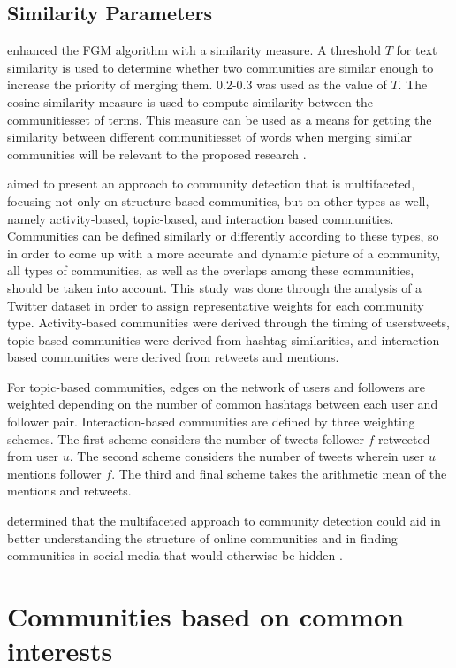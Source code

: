 \subsection{Similarity Parameters}


 enhanced the FGM algorithm with a similarity measure. A threshold $T$ for text similarity is used to determine whether two communities are similar enough to increase the priority of merging them. 0.2-0.3 was used as the value of $T$. The cosine similarity measure is used to compute similarity between the communities\vtick set of terms. This measure can be used as a means for getting the similarity between different communities\vtick set of words when merging similar communities will be relevant to the proposed research \cite{Bakillah:2014}.


 aimed to present an approach to community detection that is multifaceted, focusing not only on structure-based communities, but on other types as well, namely activity-based, topic-based, and interaction based communities. Communities can be defined similarly or differently according to these types, so in order to come up with a more accurate and dynamic picture of a community, all types of communities, as well as the overlaps among these communities, should be taken into account. This study was done through the analysis of a Twitter dataset in order to assign representative weights for each community type. Activity-based communities were derived through the timing of users\vtick tweets, topic-based communities were derived from hashtag similarities, and interaction-based communities were derived from retweets and mentions. 


For topic-based communities, edges on the network of users and followers are weighted depending on the number of common hashtags between each user and follower pair. Interaction-based communities are defined by three weighting schemes. The first scheme considers the number of tweets follower $f$ retweeted from user $u$. The second scheme considers the number of tweets wherein user $u$ mentions follower $f$. The third and final scheme takes the arithmetic mean of the mentions and retweets.


 determined that the multifaceted approach to community detection could aid in better understanding the structure of online communities and in finding communities in social media that would otherwise be hidden \cite{Darmon:2015}.


\section{Communities based on common interests}


